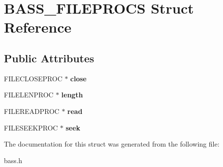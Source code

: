 \section{B\+A\+S\+S\+\_\+\+F\+I\+L\+E\+P\+R\+O\+C\+S Struct Reference}
\label{struct_b_a_s_s___f_i_l_e_p_r_o_c_s}
\subsection*{Public Attributes}
\begin{DoxyCompactItemize}
\item 
F\+I\+L\+E\+C\+L\+O\+S\+E\+P\+R\+O\+C $\ast$ {\bfseries close}\label{struct_b_a_s_s___f_i_l_e_p_r_o_c_s_a6e99c31d56497cba4947973a445310cf}

\item 
F\+I\+L\+E\+L\+E\+N\+P\+R\+O\+C $\ast$ {\bfseries length}\label{struct_b_a_s_s___f_i_l_e_p_r_o_c_s_a70f1e1025d2f932d710c3c4f194316f3}

\item 
F\+I\+L\+E\+R\+E\+A\+D\+P\+R\+O\+C $\ast$ {\bfseries read}\label{struct_b_a_s_s___f_i_l_e_p_r_o_c_s_a8da5b2c3da32ce6f9eddb7086a4f3259}

\item 
F\+I\+L\+E\+S\+E\+E\+K\+P\+R\+O\+C $\ast$ {\bfseries seek}\label{struct_b_a_s_s___f_i_l_e_p_r_o_c_s_ae878d5fa1534181ebbb3afc66b7afc42}

\end{DoxyCompactItemize}


The documentation for this struct was generated from the following file\+:\begin{DoxyCompactItemize}
\item 
bass.\+h\end{DoxyCompactItemize}

